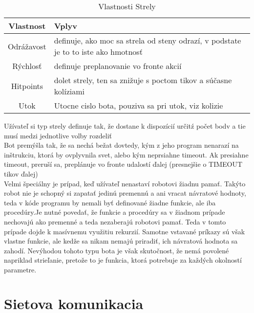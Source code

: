 \documentclass[a4paper,11pt,final]{report}
\begin{document}
\begin{table}[ht]
\caption{Vlastnosti Strely}   %
\centering                          %
\begin{tabular}{ | c | p{10cm} |}            %
\hline\hline                        %
Vlastnost & Vplyv \\   %
\hline                              %
Odrážavost & definuje, ako moc sa strela od steny odrazí, v podstate je to to iste ako hmotnosť\\ \hline
Rýchlosť & definuje preplanovanie vo fronte akcií\\ \hline
Hitpoints  & dolet strely, ten sa znižuje s poctom tikov a súčasne kolíziami\\ \hline
Utok & Utocne cislo bota, pouziva sa pri utok, viz kolizie \\ \hline
\hline                              %
\end{tabular}
\label{table:vlastnosti}          %
\end{table}

Užívateľ si typ strely definuje tak, že dostane k dispozícií určitź počet bodv a tie musí medzi jednotlive volby rozdeliť\\
Bot premýšla tak, že sa nechá bežat dovtedy, kým z jeho program nenarazí na inštrukciu, ktorá by ovplyvnila svet, alebo kým neprsiahne timeout. Ak presiahne timeout, preruší sa, preplánuje vo fronte udalostí ďalej (presnejšie o TIMEOUT tikov ďalej)\\
Velmi špeciálny je prípad, keď užívateľ nenastaví robotovi žiadnu pamať. Takýto robot nie je schopný si zapatať jedinú premennú a ani vracat návratové hodnoty, teda v kóde programu by nemali byť definované žiadne funkcie, ale iba procedúry.Je nutné povedať, že funkcie a procedúry sa v žiadnom prípade nechovajú ako premenné a teda nezaberajú robotovi pamať. Teda v tomto prípade dojde k masívnemu využitiu rekurzií. Samotne vstavané príkazy sú však vlastne funkcie, ale kedže sa nikam nemajú priradiť, ich návratová hodnota sa zahodí. Nevýhodou tohoto typu bota je však skutočnost, že nemá povolené napriklad strieľanie, pretože to je funkcia, ktorá potrebuje za každých okolností parametre.
\section{Sietova komunikacia}
\end{document}
